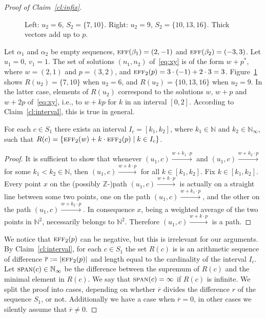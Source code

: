 \documentclass[a4paper, UKenglish, cleveref, autoref, thm-restate]{lipics-v2021}
\newcommand{\N}{\mathbb{N}}
\newcommand{\Z}{\mathbb{Z}}
\newcommand{\set}[1]{\{#1\}}
\newcommand{\setof}[2]{\set{#1 \mid #2}}
\newcommand{\trans}[1]{\stackrel{#1}{\longrightarrow}}
\newcommand{\spn}{\textsc{span}}
\newcommand{\eff}{\textsc{eff}}
\newcommand{\essdvass}[1]{\overline{#1}}
\newcommand{\absv}[1]{|#1|}
\begin{document}
\begin{appendixproof}
\begin{proof}[Proof of Claim~\ref{cl:infix}]
\begin{example}
\begin{figure}[t]
\caption{Left: $u_2 = 6$, $S_2 = \set{7,10}$. Right: $u_2 = 9$, $S_2 = \set{10,13,16}$.
Thick vectors add up to $p$.}
\label{fig:infix}
\end{figure}

Let $\alpha_1$ and $\alpha_2$ be empty sequences, $\eff(\beta_1) = (2, -1)$ and $\eff(\beta_2) = (-3, 3)$.
Let $u_1 = 0$, $v_1 = 1$. 
The set of solutions $(n_1, n_2)$ of~\eqref{eq:xy} is of the form $w+p^*$, where
$w = (2,1)$ and $p = (3,2)$, and
$\eff_2(p) = 3 \cdot (-1) + 2 \cdot 3 = 3$.
Figure~\ref{fig:infix} shows $R(u_2) = \set{7,10}$ when $u_2 = 6$, and $R(u_2)  = \set{10,13,16}$ when $u_2 = 9$.
In the latter case, elements of $R(u_2)$ correspond to the solutions $w$, $w+p$ and $w+2p$ of~\eqref{eq:xy},
i.e., to $w + kp$ for $k$ in an interval $[0,2]$.
According to Claim~\ref{cl:interval}, this is true in general.
\end{example}



\begin{claim}\label{cl:interval}
For each $c \in S_1$ there exists an interval $I_{c} = [k_1, k_2]$, where $k_1\in \N$ and $k_2 \in \N_{\infty}$,
such that
$R(c) = \setof{\eff_2(w) + k \cdot \eff_2(p)}{k\in I_{c}}$.
\end{claim}

\begin{proof}
It is sufficient to show that whenever $(u_1, c) \trans{w + k_1 \cdot p}$ and
$(u_1, c) \trans{w + k_2 \cdot p}$ for some
$k_1 < k_2 \in \N$,
then
$(u_1, c) \trans{w + k \cdot p}$ for all $k \in [k_1, k_2]$.
Fix $k \in [k_1, k_2]$.
Every point $x$ on the (possibly $\Z$-)path $(u_1, c) \trans{w + k \cdot p}$ is actually on a straight line between some two points,
one on the path $(u_1, c) \trans{w + k_1 \cdot p}$, and the other on the path $(u_1, c) \trans{w + k_2 \cdot p}$.
In consequence $x$, being a weighted average of the two points in $\N^2$, necessarily belongs to $\N^2$. 
Therefore $(u_1, c) \trans{w + k \cdot p}$ is a path.
\end{proof}

We notice that $\eff_2(p)$ can be negative, but this is irrelevant for our arguments.
By Claim~\ref{cl:interval}, for each $c \in S_1$ the set $R(c)$ is
is an arithmetic sequence of difference $\essdvass r := \absv{\eff_2(p)}$ and length equal to the cardinality
of the interval $I_{c}$.
Let $\spn(c)\in\N_\infty$ be the difference between the supremum of $R(c)$ and the minimal element in $R(c)$.
We say that $\spn(c) = \infty$ if $R(c)$ is infinite.
We split the proof into cases, depending on
whether $\essdvass r$ divides the difference $r$ of the sequence $S_1$, or not.
Additionally we have a case when $\essdvass r = 0$, in other cases we silently assume that $\essdvass r \neq 0$.



\end{proof}
\end{appendixproof}
\end{document}
